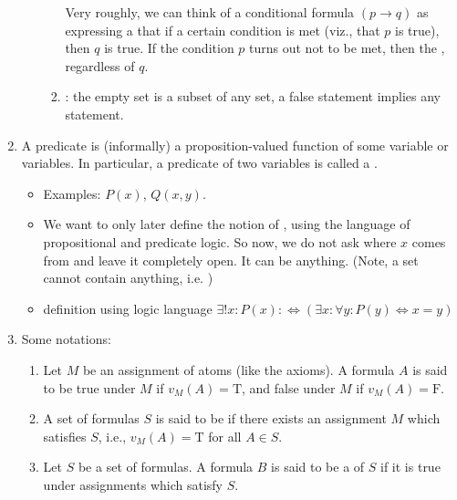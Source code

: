 \documentclass{article}
\begin{document}
\begin{enumerate}
\begin{itemize}
\begin{enumerate}
Very roughly, we can think of a conditional formula $(p \rightarrow q)$ as expressing a  that if a certain condition is met (viz., that $p$ is true), then $q$ is true. If the condition $p$ turns out not to be met, then the , regardless of $q$.
\item {}: the empty set is a subset of any set, a false statement implies any statement.
        \end{enumerate}
    \end{itemize}
    \item {} A predicate is (informally) a proposition-valued function of some variable or variables. In particular, a predicate of two variables is called a . 
\begin{itemize}
    \item Examples: $P(x)$, $Q(x,y)$.
    \item We want to only later define the notion of , using the language of propositional and predicate logic. So now, we do not ask where $x$ comes from and leave it completely open. It can be anything. (Note, a set cannot contain anything, i.e. )
    \item {} definition using logic language $\exists ! x: P(x): \Leftrightarrow(\exists x: \forall y: P(y) \Leftrightarrow x=y)$
\end{itemize} 
\item Some notations: 
\begin{enumerate}
    \item Let $M$ be an assignment of atoms  (like the axioms). A formula $A$ is said to be true under $M$ if $v_{M}(A)=\mathrm{T}$, and false under $M$ if $v_{M}(A)=\mathrm{F}$. 

\item  A set of formulas $S$ is said to be  if there exists an assignment $M$ which satisfies $S$, i.e., $v_{M}(A)=\mathrm{T}$ for all $A \in S$.

\item Let $S$ be a set of formulas. A formula $B$ is said to be a  of $S$ if it is true under  assignments which satisfy $S$.


\end{enumerate}
\end{enumerate}
\end{document}

